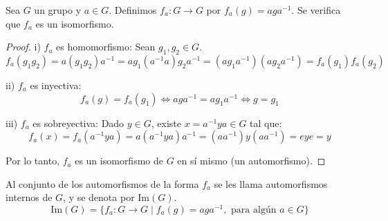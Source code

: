 \begin{prop}
    Sea $G$ un grupo y $a \in G$. Definimos $f_a: G \to G$ por $f_a(g) = aga^{-1}$. Se verifica que $f_a$ es un isomorfismo.
\end{prop}

\begin{proof}
    i) $f_a$ es homomorfismo:
    Sean $g_1, g_2 \in G$.
    \begin{equation*}
        f_a(g_1 g_2) = a(g_1 g_2)a^{-1} = a g_1 (a^{-1} a) g_2 a^{-1} = (a g_1 a^{-1})(a g_2 a^{-1}) = f_a(g_1) f_a(g_2)
    \end{equation*}
    
    ii) $f_a$ es inyectiva:
    \begin{equation*}
        f_a(g) = f_a(g_1) \iff aga^{-1} = ag_1 a^{-1} \iff g = g_1
    \end{equation*}

    iii) $f_a$ es sobreyectiva:
    Dado $y \in G$, existe $x = a^{-1} y a \in G$ tal que:
    \begin{equation*}
        f_a(x) = f_a(a^{-1} y a) = a(a^{-1} y a)a^{-1} = (a a^{-1}) y (a a^{-1}) = e y e = y
    \end{equation*}
    
    Por lo tanto, $f_a$ es un isomorfismo de $G$ en sí mismo (un automorfismo).
\end{proof}

\begin{defi}
    Al conjunto de los automorfismos de la forma $f_a$ se les llama automorfismos internos de $G$, y se denota por $\text{Im}(G)$.
    \begin{equation*}
        \text{Im}(G) = \{ f_a: G \to G \mid f_a(g) = aga^{-1}, \text{ para algún } a \in G \}
    \end{equation*}
\end{defi}

\begin{center}
\end{center}

